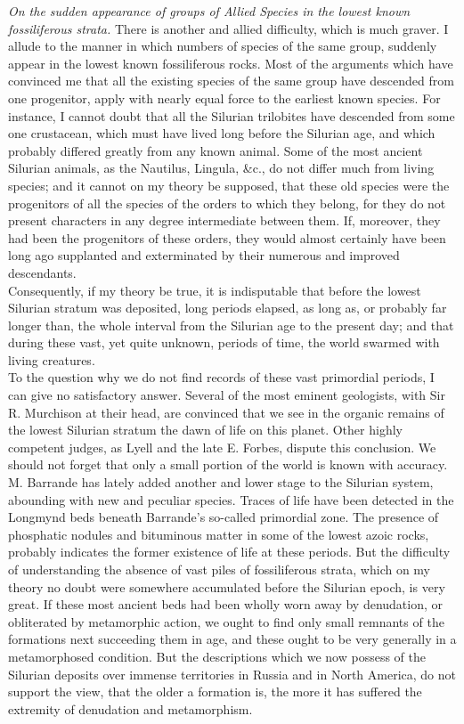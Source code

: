 \indent \emph{On the sudden appearance of groups of Allied Species in the lowest known fossiliferous strata.} There is another and allied difficulty, which is much graver. I allude to the manner in which numbers of species of the same group, suddenly appear in the lowest known fossiliferous rocks. Most of the arguments which have convinced me that all the existing species of the same group have descended from one progenitor, apply with nearly equal force to the earliest known species. For instance, I cannot doubt that all the Silurian trilobites have descended from some one crustacean, which must have lived long before the Silurian age, and which probably differed greatly from any known animal. Some of the most ancient Silurian animals, as the Nautilus, Lingula, \&c., do not differ much from living species; and it cannot on my theory be supposed, that these old species were the progenitors of all the species of the orders to which they belong, for they do not present characters in any degree intermediate between them.  If, moreover, they had been the progenitors of these orders, they would almost certainly have been long ago supplanted and exterminated by their numerous and improved descendants.\\
\indent Consequently, if my theory be true, it is indisputable that before the lowest Silurian stratum was deposited, long periods elapsed, as long as, or probably far longer than, the whole interval from the Silurian age to the present day; and that during these vast, yet quite unknown, periods of time, the world swarmed with living creatures.\\
\indent To the question why we do not find records of these vast primordial periods, I can give no satisfactory answer.  Several of the most eminent geologists, with Sir R. Murchison at their head, are convinced that we see in the organic remains of the lowest Silurian stratum the dawn of life on this planet. Other highly competent judges, as Lyell and the late E. Forbes, dispute this conclusion. We should not forget that only a small portion of the world is known with accuracy. M. Barrande has lately added another and lower stage to the Silurian system, abounding with new and peculiar species. Traces of life have been detected in the Longmynd beds beneath Barrande's so-called primordial zone.  The presence of phosphatic nodules and bituminous matter in some of the lowest azoic rocks, probably indicates the former existence of life at these periods. But the difficulty of understanding the absence of vast piles of fossiliferous strata, which on my theory no doubt were somewhere accumulated before the Silurian epoch, is very great. If these most ancient beds had been wholly worn away by denudation, or obliterated by metamorphic action, we ought to find only small remnants of the formations next succeeding them in age, and these ought to be very generally in a metamorphosed condition. But the descriptions which we now possess of the Silurian deposits over immense territories in Russia and in North America, do not support the view, that the older a formation is, the more it has suffered the extremity of denudation and metamorphism.\\
